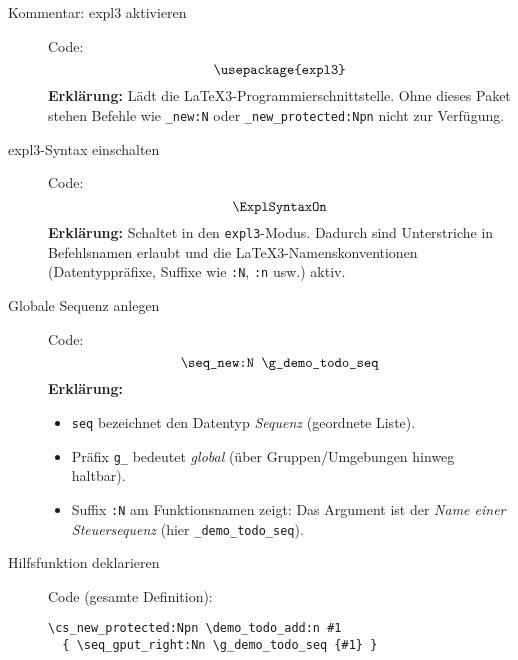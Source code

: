 \documentclass[11pt,a4paper]{book}
\begin{document}
\begin{description}

  \item[Kommentar: expl3 aktivieren]
  Code:
  \[
    \texttt{\string\usepackage\{expl3\}}
  \]
  \textbf{Erklärung:} Lädt die LaTeX3-Programmierschnittstelle. Ohne dieses Paket stehen Befehle wie \texttt{\string\seq\_new:N} oder \texttt{\string\cs\_new\_protected:Npn} nicht zur Verfügung.

  \item[expl3-Syntax einschalten]
  Code:
  \[
    \texttt{\string\ExplSyntaxOn}
  \]
  \textbf{Erklärung:} Schaltet in den \texttt{expl3}-Modus. Dadurch sind Unterstriche in Befehlsnamen erlaubt und die LaTeX3-Namenskonventionen (Datentyppräfixe, Suffixe wie \texttt{:N}, \texttt{:n} usw.) aktiv.

  \item[Globale Sequenz anlegen]
  Code:
  \[
    \texttt{\string\seq\_new:N \string\g\_demo\_todo\_seq}
  \]
  \textbf{Erklärung:}
  \begin{itemize}
    \item \texttt{seq} bezeichnet den Datentyp \emph{Sequenz} (geordnete Liste).
    \item Präfix \texttt{g\_} bedeutet \emph{global} (über Gruppen/Umgebungen hinweg haltbar).
    \item Suffix \texttt{:N} am Funktionsnamen zeigt: Das Argument ist der \emph{Name einer Steuersequenz} (hier \texttt{\string\g\_demo\_todo\_seq}).
  \end{itemize}

  \item[Hilfsfunktion deklarieren]
  
Code (gesamte Definition):
\begin{verbatim}
\cs_new_protected:Npn \demo_todo_add:n #1
  { \seq_gput_right:Nn \g_demo_todo_seq {#1} }
\end{verbatim}


\end{description}
\end{document}
